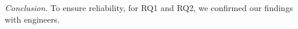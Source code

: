 {\emph{Conclusion}. To ensure reliability, for RQ1 and RQ2, we confirmed our findings with engineers.}

%








